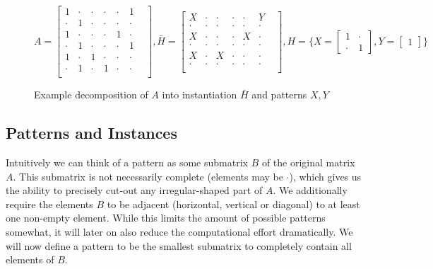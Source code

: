 \documentclass{llncs}
\begin{document}
\begin{figure}

\small
$$
A =
\begin{bmatrix}
1 & \cdot & \cdot & \cdot & \cdot & 1 &  \\[-.2em]
\cdot & 1 & \cdot & \cdot & \cdot & \cdot &  \\[-.2em]
1 & \cdot & \cdot & \cdot & 1 & \cdot &  \\[-.2em]
\cdot & 1 & \cdot & \cdot & \cdot & 1 &  \\[-.2em]
1 & \cdot & 1 & \cdot & \cdot & \cdot &  \\[-.2em]
\cdot & 1 & \cdot & 1 & \cdot & \cdot &  \\
\end{bmatrix}\!\!,
\bar{H} = 
\begin{bmatrix}
X & \cdot & \cdot & \cdot & \cdot & Y &  \\[-.2em]
\cdot & \cdot & \cdot & \cdot & \cdot & \cdot &  \\[-.2em]
X & \cdot & \cdot & \cdot & X & \cdot &  \\[-.2em]
\cdot & \cdot & \cdot & \cdot & \cdot & \cdot &  \\[-.2em]
X & \cdot & X & \cdot & \cdot & \cdot &  \\[-.2em]
\cdot & \cdot & \cdot & \cdot & \cdot & \cdot &  \\
\end{bmatrix}\!\!,
H = \{
X =
\begin{bmatrix}
1 & \cdot \\[-.2em]
\cdot & 1
\end{bmatrix}\!\!,
Y =
\begin{bmatrix}
1
\end{bmatrix}\}
$$
\caption{Example decomposition of $A$ into instantiation $\bar{H}$ and patterns $X,Y$}
\label{example1}
\end{figure}

\subsection{Patterns and Instances}
Intuitively we can think of a pattern as some submatrix $B$ of the original matrix $A$. This submatrix is not necessarily complete (elements may be $\cdot$), which gives us the ability to precisely cut-out any irregular-shaped part of $A$. We additionally require the elements $B$ to be adjacent (horizontal, vertical or diagonal) to at least one non-empty element. While this limits the amount of possible patterns somewhat, it will later on also reduce the computational effort dramatically. We will now define a pattern to be the smallest submatrix to completely contain all elements of $B$.
\end{document}
